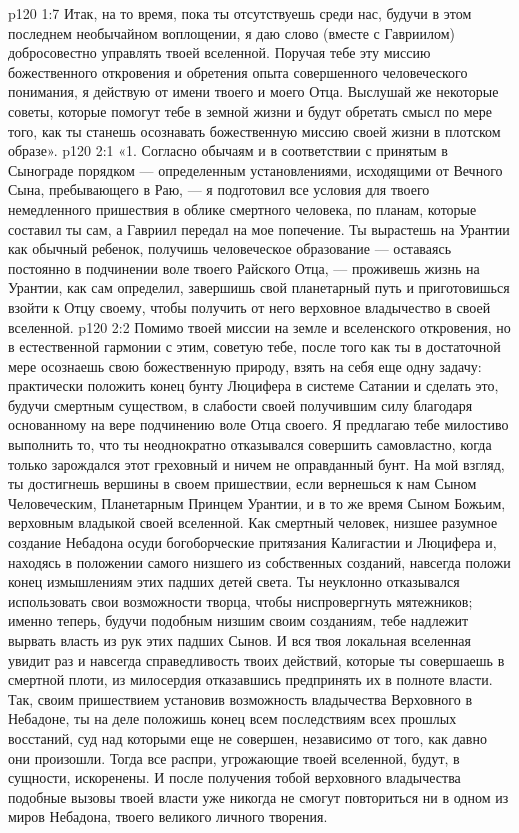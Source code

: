 \vs p120 1:7 Итак, на то время, пока ты отсутствуешь среди нас, будучи в этом последнем необычайном воплощении, я даю слово (вместе с Гавриилом) добросовестно управлять твоей вселенной. Поручая тебе эту миссию божественного откровения и обретения опыта совершенного человеческого понимания, я действую от имени твоего и моего Отца. Выслушай же некоторые советы, которые помогут тебе в земной жизни и будут обретать смысл по мере того, как ты станешь осознавать божественную миссию своей жизни в плотском образе».
\vs p120 2:1 «1. Согласно обычаям и в соответствии с принятым в Сынограде порядком --- определенным установлениями, исходящими от Вечного Сына, пребывающего в Раю, --- я подготовил все условия для твоего немедленного пришествия в облике смертного человека, по планам, которые составил ты сам, а Гавриил передал на мое попечение. Ты вырастешь на Урантии как обычный ребенок, получишь человеческое образование --- оставаясь постоянно в подчинении воле твоего Райского Отца, --- проживешь жизнь на Урантии, как сам определил, завершишь свой планетарный путь и приготовишься взойти к Отцу своему, чтобы получить от него верховное владычество в своей вселенной.
\vs p120 2:2 \pc {}\bibnobreakspace Помимо твоей миссии на земле и вселенского откровения, но в естественной гармонии с этим, советую тебе, после того как ты в достаточной мере осознаешь свою божественную природу, взять на себя еще одну задачу: практически положить конец бунту Люцифера в системе Сатании и сделать это, будучи  смертным существом, в слабости своей получившим силу благодаря основанному на вере подчинению воле Отца своего. Я предлагаю тебе милостиво выполнить то, что ты неоднократно отказывался совершить самовластно, когда только зарождался этот греховный и ничем не оправданный бунт. На мой взгляд, ты достигнешь вершины в своем пришествии, если вернешься к нам Сыном Человеческим, Планетарным Принцем Урантии, и в то же время Сыном Божьим, верховным владыкой своей вселенной. Как смертный человек, низшее разумное создание Небадона осуди богоборческие притязания Калигастии и Люцифера и, находясь в положении самого низшего из собственных созданий, навсегда положи конец измышлениям этих падших детей света. Ты неуклонно отказывался использовать свои возможности творца, чтобы ниспровергнуть мятежников; именно теперь, будучи подобным низшим своим созданиям, тебе надлежит вырвать власть из рук этих падших Сынов. И вся твоя локальная вселенная увидит раз и навсегда справедливость твоих действий, которые ты совершаешь в смертной плоти, из милосердия отказавшись предпринять их в полноте власти. Так, своим пришествием установив возможность владычества Верховного в Небадоне, ты на деле положишь конец всем последствиям всех прошлых восстаний, суд над которыми еще не совершен, независимо от того, как давно они произошли. Тогда все распри, угрожающие твоей вселенной, будут, в сущности, искоренены. И после получения тобой верховного владычества подобные вызовы твоей власти уже никогда не смогут повториться ни в одном из миров Небадона, твоего великого личного творения.
